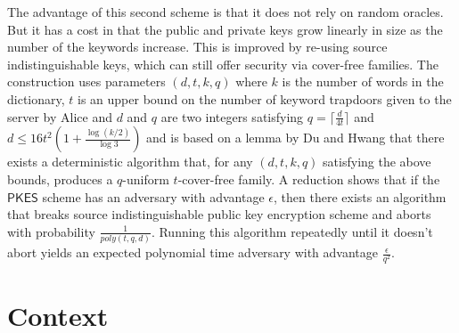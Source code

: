 \documentclass[a4paper,11pt]{article}
\begin{document}
    The advantage of this second scheme is that it does not rely on random oracles. But it has a cost in that the public and private keys grow linearly in size as the number of the keywords increase. This is improved by re-using source indistinguishable keys, which can still offer security via cover-free families. The construction uses parameters $(d, t, k, q)$ where $k$ is the number of words in the dictionary, $t$ is an upper bound on the number of keyword trapdoors given to the server by Alice and $d$ and $q$ are two integers satisfying $q = \lceil \frac{d}{4t} \rceil$ and $d \leq 16t^2(1 + \frac{\log(k/2)}{\log 3})$ and is based on a lemma by Du and Hwang that there exists a deterministic algorithm that, for any $(d, t, k, q)$ satisfying the above bounds, produces a $q$-uniform $t$-cover-free family. A reduction shows that if the $\mathsf{PKES}$ scheme has an adversary with advantage $\epsilon$, then there exists an algorithm that breaks source indistinguishable public key encryption scheme and aborts with probability $\frac{1}{poly(t, q, d)}$. Running this algorithm repeatedly until it doesn't abort yields an expected polynomial time adversary with advantage $\frac{\epsilon}{q^2}$.

    \section{Context}
\end{document}
